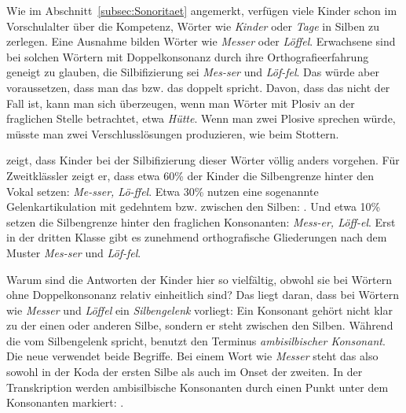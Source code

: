 Wie im Abschnitt~\ref{subsec:Sonoritaet} angemerkt, verfügen viele Kinder schon im Vorschulalter über die Kompetenz, Wörter wie \textit{Kinder} oder \textit{Tage} in Silben zu zerlegen. Eine Ausnahme bilden Wörter wie \textit{Messer} oder \textit{Löffel}. Erwachsene sind bei solchen Wörtern mit Doppelkonsonanz durch ihre Orthografieerfahrung geneigt zu glauben, die Silbifizierung sei \textit{Mes-ser} und \textit{Löf-fel}. Das würde aber voraussetzen, dass man das  bzw. das  doppelt spricht. Davon, dass das nicht der Fall ist, kann man sich überzeugen, wenn man Wörter mit Plosiv an der fraglichen Stelle betrachtet, etwa \textit{Hütte}. Wenn man zwei Plosive sprechen würde, müsste man zwei Verschlusslösungen produzieren, wie beim Stottern. 

\citet{Risel2000} zeigt, dass Kinder bei der Silbifizierung dieser Wörter völlig anders vorgehen. Für Zweitklässler zeigt er, dass etwa 60\% der Kinder die Silbengrenze hinter den Vokal setzen: \textit{Me-sser, Lö-ffel}. Etwa 30\% nutzen eine sogenannte Gelenkartikulation mit gedehntem  bzw. 
 zwischen den Silben: . Und etwa 10\% setzen die Silbengrenze hinter den fraglichen Konsonanten: \textit{Mess-er, Löff-el}. Erst in der dritten Klasse gibt es zunehmend orthografische Gliederungen nach dem Muster \textit{Mes-ser} und \textit{Löf-fel}.

Warum sind die Antworten der Kinder hier so vielfältig, obwohl sie bei Wörtern ohne Doppelkonsonanz relativ einheitlich sind? Das liegt daran, dass bei Wörtern wie \textit{Messer} und \textit{Löffel} ein \textit{Silbengelenk} vorliegt: Ein Konsonant gehört nicht klar zu der einen oder anderen Silbe, sondern er steht zwischen den Silben. Während die \citet[862]{Duden2016} vom Silbengelenk spricht, benutzt \citet[35--36]{Wiese2000} den Terminus \textit{ambisilbischer Konsonant}. Die neue \citet[862]{Duden2022} verwendet beide Begriffe. Bei einem Wort wie \textit{Messer} steht das  also sowohl in der Koda der ersten Silbe als auch im Onset der zweiten. In der Transkription werden ambisilbische Konsonanten durch einen Punkt unter dem Konsonanten markiert: \textipa{[\textprimstress mE\.*s5]}.

